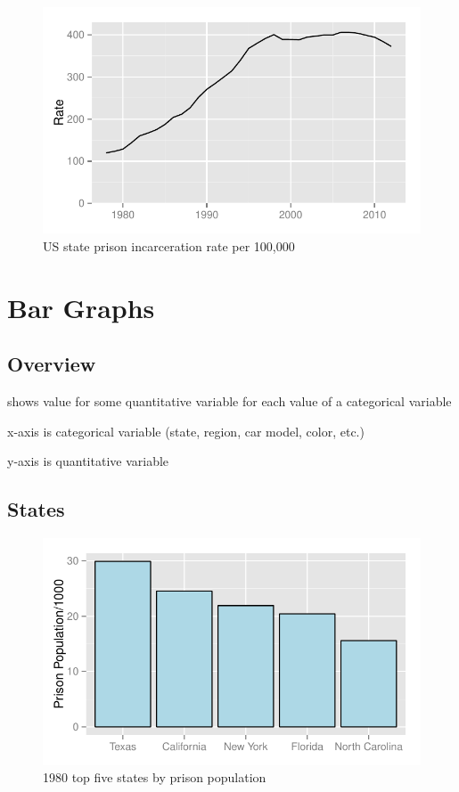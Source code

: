 \documentclass[letterpaper, landscape]{article}
\begin{document}
  \begin{figure}[H]
    \centering
    \includegraphics[scale = 0.8]{figures/state_incarceration_rate_growth.pdf}
    \caption{US state prison incarceration rate per 100,000}\label{fig:rate_growth}
  \end{figure}

  \section{Bar Graphs}

  \subsection{Overview}
  \begin{itemize*}
    \item shows value for some quantitative variable for each value of a categorical variable
    \item x-axis is categorical variable (state, region, car model, color, etc.)
    \item y-axis is quantitative variable
  \end{itemize*}

  \subsection{States}

  \begin{figure}[H]
    \centering
    \includegraphics[scale = 0.8]{figures/top_five_1980.pdf}
    \caption{1980 top five states by prison population}
  \end{figure}
\end{document}
